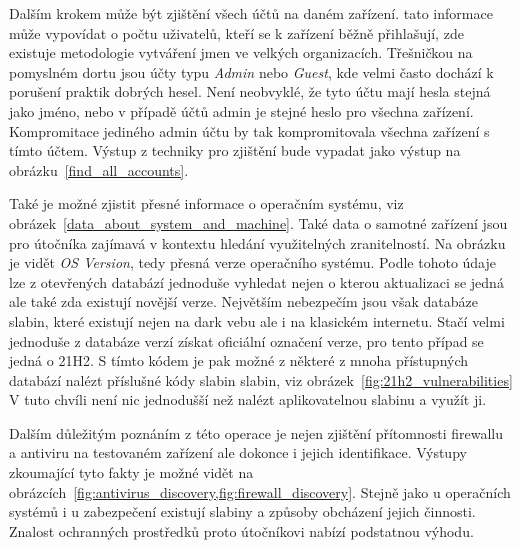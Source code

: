 Dalším krokem může být zjištění všech účtů na daném zařízení.
tato informace může vypovídat o počtu uživatelů, kteří se k zařízení běžně přihlašují, zde existuje metodologie vytváření jmen ve velkých organizacích.
Třešničkou na pomyslném dortu jsou účty typu \textit{Admin} nebo \textit{Guest}, kde velmi často dochází k porušení praktik dobrých hesel.
Není neobvyklé, že tyto účtu mají hesla stejná jako jméno, nebo v případě účtů admin je stejné heslo pro všechna zařízení.
Kompromitace jediného admin účtu by tak kompromitovala všechna zařízení s tímto účtem.
Výstup z techniky pro zjištění bude vypadat jako výstup na obrázku~\ref{find_all_accounts}.


Také je možné zjistit přesné informace o operačním systému, viz obrázek~\ref{data_about_system_and_machine}.
Také data o samotné zařízení jsou pro útočníka zajímavá v kontextu hledání využitelných zranitelností.
Na obrázku je vidět \textit{OS Version}, tedy přesná verze operačního systému.
Podle tohoto údaje lze z otevřených databází jednoduše vyhledat nejen o kterou aktualizaci se jedná ale také zda existují novější verze.
Největším nebezpečím jsou však databáze slabin, které existují nejen na dark vebu ale i na klasickém internetu.
Stačí velmi jednoduše z databáze verzí získat oficiální označení verze, pro tento případ se jedná o 21H2\cite{win_versions}.
S tímto kódem je pak možné z některé z mnoha přístupných databází nalézt příslušné kódy slabin slabin, viz obrázek~\ref{fig:21h2_vulnerabilities}
V tuto chvíli není nic jednodušší než nalézt aplikovatelnou slabinu a využít ji.


Dalším důležitým poznáním z této operace je nejen zjištění přítomnosti firewallu a antiviru na testovaném zařízení ale dokonce i jejich identifikace.
Výstupy zkoumající tyto fakty je možné vidět na obrázcích~\ref{fig:antivirus_discovery,fig:firewall_discovery}.
Stejně jako u operačních systémů i u zabezpečení existují slabiny a způsoby obcházení jejich činnosti.
Znalost ochranných prostředků proto útočníkovi nabízí podstatnou výhodu.

